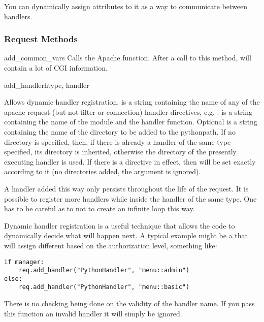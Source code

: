 You can dynamically assign attributes to it as a way to communicate
between handlers.

\subsubsection{Request Methods\label{pyapi-mprequest-meth}}

\begin{methoddesc}[request]{add_common_vars}{}
  Calls the Apache  function. After a
  call to this method,  will contain a
  lot of CGI information.
\end{methoddesc}

\begin{methoddesc}[request]{add_handler}{htype, handler}

  Allows dynamic handler registration.  is a string
  containing the name of any of the apache request (but not filter or
  connection) handler directives,
  e.g. .  is a string containing the
  name of the module and the handler function.  Optional  is
  a string containing the name of the directory to be added to the
  pythonpath. If no directory is specified, then, if there is already
  a handler of the same type specified, its directory is inherited,
  otherwise the directory of the presently executing handler is
  used. If there is a  directive in effect, then
   will be set exactly according to it (no directories
  added, the  argument is ignored).
  
  A handler added this way only persists throughout the life of the
  request. It is possible to register more handlers while inside the
  handler of the same type. One has to be careful as to not to create
  an infinite loop this way.

  Dynamic handler registration is a useful technique that allows the
  code to dynamically decide what will happen next. A typical example
  might be a  that will assign different
   based on the authorization level, something
  like:

  \begin{verbatim}
if manager:
    req.add_handler("PythonHandler", "menu::admin")
else:
    req.add_handler("PythonHandler", "menu::basic")
  \end{verbatim}                              

  \begin{notice}
    There is no checking being done on the validity of the handler
    name. If you pass this function an invalid handler it will simply be
    ignored.
  \end{notice}
\end{methoddesc}

